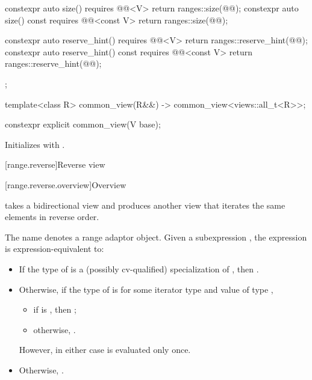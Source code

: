 \begin{codeblock}
{{    constexpr auto size() requires @@<V> {
      return ranges::size(@@);
    }
    constexpr auto size() const requires @@<const V> {
      return ranges::size(@@);
    }

    constexpr auto reserve_hint() requires @@<V> {
      return ranges::reserve_hint(@@);
    }
    constexpr auto reserve_hint() const requires @@<const V> {
      return ranges::reserve_hint(@@);
    }
  };

  template<class R>
    common_view(R&&) -> common_view<views::all_t<R>>;
}
\end{codeblock}

%
\begin{itemdecl}
constexpr explicit common_view(V base);
\end{itemdecl}

\begin{itemdescr}
\pnum
\effects
Initializes  with .
\end{itemdescr}

[range.reverse]{Reverse view}

[range.reverse.overview]{Overview}

\pnum
{} takes a bidirectional view and produces
another view that iterates the same elements in reverse order.

\pnum
{}%
The name  denotes a
range adaptor object.
Given a subexpression , the expression
 is expression-equivalent to:
\begin{itemize}
\item
  If the type of  is
  a (possibly cv-qualified) specialization of ,
  then .
\item
  Otherwise, if the type of  is \cv{} 
  for some iterator type  and
  value  of type ,
  \begin{itemize}
  \item
    if  is , then
;
  \item
    otherwise, .
  \end{itemize}
  However, in either case  is evaluated only once.
\item
  Otherwise, .
\end{itemize}

